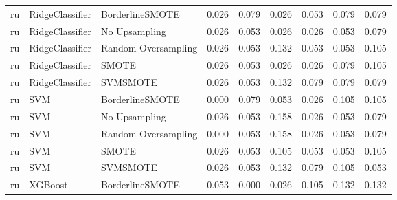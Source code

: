 \begin{tabular}{lllllllll}
      ru &              RidgeClassifier &     BorderlineSMOTE & 0.026 &                     0.079 &                 0.026 &                  0.053 &                                   0.079 &     0.079 \\
      ru &              RidgeClassifier &       No Upsampling & 0.026 &                     0.053 &                 0.026 &                  0.026 &                                   0.053 &     0.079 \\
      ru &              RidgeClassifier & Random Oversampling & 0.026 &                     0.053 &                 0.132 &                  0.053 &                                   0.053 &     0.105 \\
      ru &              RidgeClassifier &               SMOTE & 0.026 &                     0.053 &                 0.026 &                  0.026 &                                   0.079 &     0.105 \\
      ru &              RidgeClassifier &            SVMSMOTE & 0.026 &                     0.053 &                 0.132 &                  0.079 &                                   0.079 &     0.079 \\
      ru &                          SVM &     BorderlineSMOTE & 0.000 &                     0.079 &                 0.053 &                  0.026 &                                   0.105 &     0.105 \\
      ru &                          SVM &       No Upsampling & 0.026 &                     0.053 &                 0.158 &                  0.026 &                                   0.053 &     0.079 \\
      ru &                          SVM & Random Oversampling & 0.000 &                     0.053 &                 0.158 &                  0.026 &                                   0.053 &     0.079 \\
      ru &                          SVM &               SMOTE & 0.026 &                     0.053 &                 0.105 &                  0.053 &                                   0.053 &     0.105 \\
      ru &                          SVM &            SVMSMOTE & 0.026 &                     0.053 &                 0.132 &                  0.079 &                                   0.105 &     0.053 \\
      ru &                      XGBoost &     BorderlineSMOTE & 0.053 &                     0.000 &                 0.026 &                  0.105 &                                   0.132 &     0.132 \\

\end{tabular}
